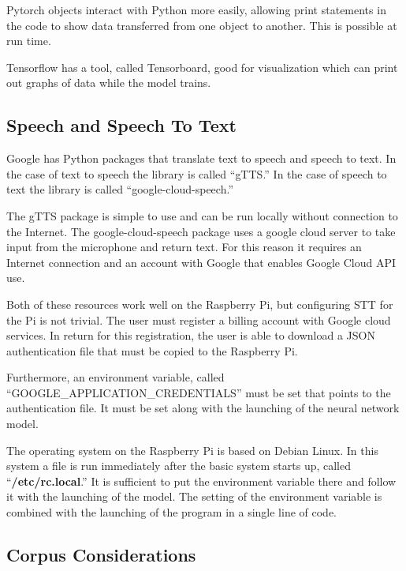 Pytorch objects interact with Python more easily, allowing print statements in the code to show data transferred from one object to another. This is possible at run time.

Tensorflow has a tool, called Tensorboard, good for visualization which can print out graphs of data while the model trains. 

\subsection{Speech and Speech To Text}
\label{speech-and-speech-to-text}

Google has Python packages that translate text to speech and speech to text. In the case of text to speech the library is called ``\ac{gTTS}.'' In the case of speech to text the library is called ``google-cloud-speech.'' 

The gTTS package is simple to use and can be run locally without connection to the Internet. The google-cloud-speech package uses a google cloud server to take input from the microphone and return text. For this reason it requires an Internet connection and an account with Google that enables Google Cloud API use. %

Both of these resources work well on the Raspberry Pi, but configuring STT for the Pi is not trivial. The user must register a billing account with Google cloud services. In return for this registration, the user is able to download a JSON authentication file that must be copied to the Raspberry Pi. 

Furthermore, an environment variable, called ``GOOGLE\_APPLICATION\_CREDENTIALS'' must be set that points to the authentication file. It must be set along with the launching of the neural network model.

The operating system on the Raspberry Pi is based on Debian Linux. In this system a file is run immediately after the basic system starts up, called ``\textbf{/etc/rc.local}.'' It is sufficient to put the environment variable there and follow it with the launching of the model. The setting of the environment variable is combined with the launching of the program in a single line of code.


\subsection{Corpus Considerations}

